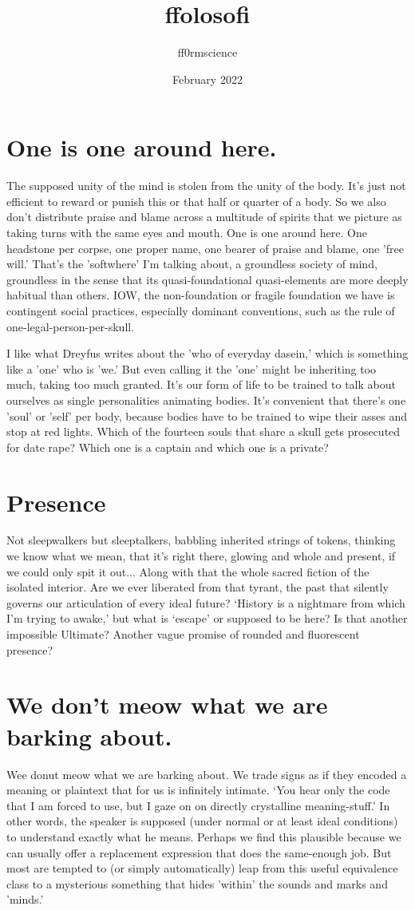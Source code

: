 \documentclass{article}
\title{ffolosofi}
\author{ff0rmscience }
\date{February 2022}
\begin{document}
\section{One is one around here.}

The supposed unity of the mind is stolen from the unity of the body. It's just not efficient to reward or punish this or that half or quarter of a body. So we also don't distribute praise and blame across a multitude of spirits that we picture as taking turns with the same eyes and mouth. One is one around here. One headstone per corpse, one proper name, one bearer of praise and blame, one 'free will.'  That's the 'softwhere' I'm talking about, a groundless society of mind, groundless in the sense that its quasi-foundational quasi-elements are more deeply habitual than others. IOW, the non-foundation or fragile foundation we have is contingent social practices, especially dominant conventions, such as the rule of one-legal-person-per-skull.
\newline

I like what Dreyfus writes about the 'who of everyday dasein,' which is something like a 'one' who is 'we.' But even calling it the 'one' might be inheriting too much, taking too much granted. It's our form of life to be trained to talk about ourselves as single personalities animating bodies. It's convenient that there's one 'soul' or 'self' per body, because bodies have to be trained to wipe their asses and stop at red lights. Which of the fourteen souls that share a skull gets prosecuted for date rape? Which one is a captain and which one is a private?
  
\section{Presence}  
Not sleepwalkers but sleeptalkers, babbling inherited strings of tokens, thinking we know what we mean, that it's right there, glowing and whole and present, if we could only spit it out... Along with that the whole sacred fiction of the isolated interior. Are we ever liberated from that tyrant, the past that silently governs our articulation of every ideal future? `History is a nightmare from which I'm trying to awake,' but what is `escape' or supposed to be here? Is that another impossible Ultimate? Another vague promise of rounded and fluorescent presence?

\section{We don't meow what we are barking about.}
Wee donut meow what we are barking about. We trade signs as if they encoded a meaning or plaintext that for us is infinitely intimate. `You hear only the code that I am forced to use, but I gaze on on directly crystalline meaning-stuff.' In other words, the speaker is supposed (under normal or at least ideal conditions) to understand exactly what he means. Perhaps we find this plausible because we can usually offer a replacement expression that does the same-enough job. But most are tempted to (or simply automatically) leap from this useful equivalence class to a mysterious something that hides 'within' the sounds and marks and 'minds.'
\end{document}
